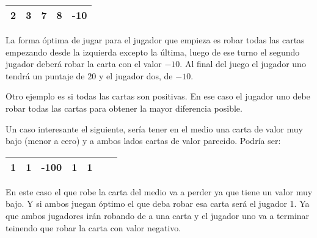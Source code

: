 \begin{center}
\begin{tabular}{|c|c|c|c|c|}
\hline
2 & 3 & 7 & 8 & -10 \\
\hline
\end{tabular}
\end{center}

La forma óptima de jugar para el jugador que empieza es robar todas las cartas empezando desde la izquierda excepto la última, luego de ese turno el segundo jugador deberá robar la carta con el valor $-10$. Al final del juego el jugador uno tendrá un puntaje de $20$ y el jugador dos, de $-10$.

Otro ejemplo es si todas las cartas son positivas. En ese caso el jugador uno debe robar todas las cartas para obtener la mayor diferencia posible.

Un caso interesante el siguiente, sería tener en el medio una carta de valor muy bajo (menor a cero) y a ambos lados cartas de valor parecido. Podría ser:

\begin{center}
\begin{tabular}{|c|c|c|c|c|c|c|}
\hline
1 & 1 & -100 & 1 & 1 \\
\hline
\end{tabular}
\end{center}

En este caso el que robe la carta del medio va a perder ya que tiene un valor muy bajo. Y si ambos juegan óptimo el que deba robar esa carta será el jugador 1. Ya que ambos jugadores irán robando de a una carta y el jugador uno va a terminar teinendo que robar la carta con valor negativo.